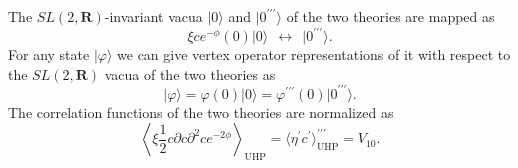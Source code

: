 \documentclass[a4paper,12pt]{article}
\newcommand{\aaru}{\mathbf{R}}
\newcommand{\tp}{\prime\prime\prime}
\begin{document}
The $SL(2,\aaru)$-invariant 
vacua $|0\rangle$ and $|0^{\tp}\rangle$ of the two theories are mapped as 
\begin{equation}
\xi ce^{-\phi}(0)|0\rangle \ \ \longleftrightarrow \ \ |0^{\tp}\rangle. \label{eq:DG}
\end{equation}
For any state $|\varphi\rangle$ we can give vertex operator representations of it with respect 
to the $SL(2,\aaru)$ vacua of the two theories as 
\begin{equation}
|\varphi\rangle=\varphi(0)|0\rangle=\varphi^{\tp}(0)|0^{\tp}\rangle. \label{eq:DH}
\end{equation}
The correlation functions of the two theories are normalized as 
\begin{equation}
\left\langle\xi\frac{1}{2}c\partial c\partial^2ce^{-2\phi}\right\rangle_{\mathrm{UHP}}
=\langle\eta^{\prime}c^{\prime}\rangle^{\tp}_{\mathrm{UHP}}=V_{10}. \label{eq:DI}
\end{equation}
\end{document}
